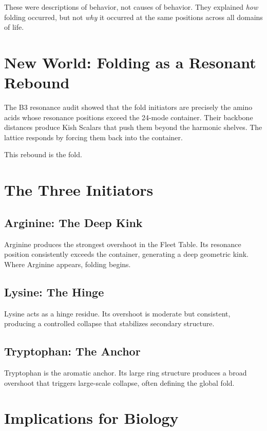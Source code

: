 \documentclass[11pt, letterpaper, openany]{book}
\begin{document}
These were descriptions of behavior, not causes of behavior. They explained
\textit{how} folding occurred, but not \textit{why} it occurred at the same
positions across all domains of life.

\section{New World: Folding as a Resonant Rebound}

The B3 resonance audit showed that the fold initiators are precisely the amino
acids whose resonance positions exceed the 24-mode container. Their backbone
distances produce Kish Scalars that push them beyond the harmonic shelves. The
lattice responds by forcing them back into the container.

This rebound is the fold.

\section{The Three Initiators}

\subsection*{Arginine: The Deep Kink}

Arginine produces the strongest overshoot in the Fleet Table. Its resonance
position consistently exceeds the container, generating a deep geometric kink.
Where Arginine appears, folding begins.

\subsection*{Lysine: The Hinge}

Lysine acts as a hinge residue. Its overshoot is moderate but consistent,
producing a controlled collapse that stabilizes secondary structure.

\subsection*{Tryptophan: The Anchor}

Tryptophan is the aromatic anchor. Its large ring structure produces a broad
overshoot that triggers large-scale collapse, often defining the global fold.

\section{Implications for Biology}
\end{document}
